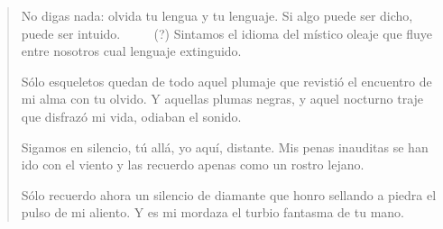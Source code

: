 \documentclass[a4paper, 12pt]{article}
\begin{document}
\pagebreak

\begin{verse}
   No digas nada: olvida tu lengua y tu lenguaje.
   Si algo puede ser dicho, puede ser intuido. $\qquad$ (?)
   Sintamos el idioma del místico oleaje 
   que fluye entre nosotros cual lenguaje extinguido.

   Sólo esqueletos quedan de todo aquel plumaje 
   que revistió el encuentro de mi alma con tu olvido.
   Y aquellas plumas negras, y aquel nocturno traje
   que disfrazó mi vida, odiaban el sonido.

   Sigamos en silencio, tú allá, yo aquí, distante.
   Mis penas inauditas se han ido con el viento 
   y las recuerdo apenas como un rostro lejano.

   Sólo recuerdo ahora un silencio de diamante
   que honro sellando a piedra el pulso de mi aliento.
   Y es mi mordaza el turbio fantasma de tu mano.
   

\end{verse}
\end{document}
